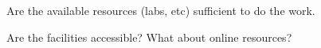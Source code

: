 Are the available resources (labs, etc) sufficient to do the work. 

Are the facilities accessible? What about online resources?